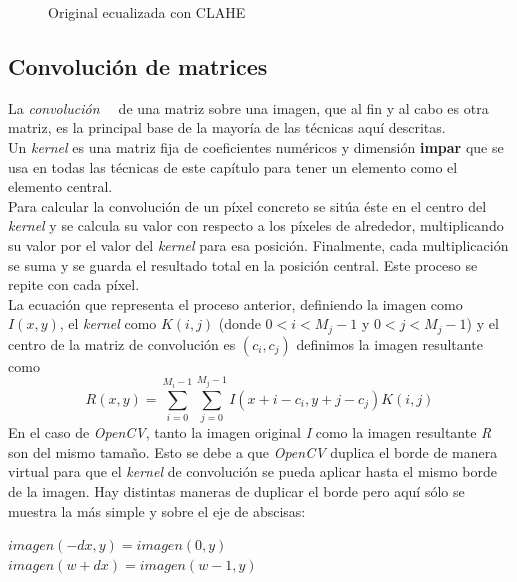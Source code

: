 \begin{figure}[H]
  \caption{Original ecualizada con CLAHE}
  \centering \setlength\fboxsep{0pt} \setlength\fboxrule{0.5pt}
\end{figure}


\subsection{Convolución de matrices}
La \emph{convolución}\emph{~\citep*[3.2 Linear
  filtering]{szeliski2010computer}}\emph{~\citep*[A.6
  Convolution]{fisher1996hypermedia}} de una matriz sobre una imagen,
que al fin y al cabo es otra matriz, es la principal base de la
mayoría de las técnicas aquí descritas. \\
Un \emph{kernel} es una matriz fija de coeficientes numéricos y
dimensión \textbf{impar} que se usa en todas las técnicas de este
capítulo para tener un elemento como el elemento central. \\
Para calcular la convolución de un píxel concreto se sitúa éste en el
centro del \emph{kernel} y se calcula su valor con respecto a los
píxeles de alrededor, multiplicando su valor por el valor del
\emph{kernel} para esa posición. Finalmente, cada multiplicación se
suma y se guarda el resultado total en la posición central. Este
proceso se repite con cada píxel. \\
La ecuación que representa el proceso anterior, definiendo la imagen
como $I(x, y)$, el \emph{kernel} como $K(i, j)$ (donde
$0 < i < M_j - 1$ y $0 < j < M_j - 1$) y el centro de la matriz de
convolución es $(c_i, c_j)$ definimos la imagen resultante como
\begin{equation*}
  R(x, y) = \sum_{i=0}^{M_i-1} \sum_{j=0}^{M_j-1}  I(x + i - c_i, y + j - c_j)K(i,j)
\end{equation*}
En el caso de \emph{OpenCV}, tanto la imagen original \emph{I} como la
imagen resultante \emph{R} son del mismo tamaño. Esto se debe a que
\emph{OpenCV} duplica el borde de manera virtual para que el
\emph{kernel} de convolución se pueda aplicar hasta el mismo borde de
la imagen. Hay distintas maneras de duplicar el borde pero aquí sólo
se muestra la más simple y sobre el eje de abscisas:
\begin{center}
  $imagen(-dx, y) = imagen(0, y)$
  \\
  $imagen(w + dx) = imagen(w - 1, y)$
\end{center}


